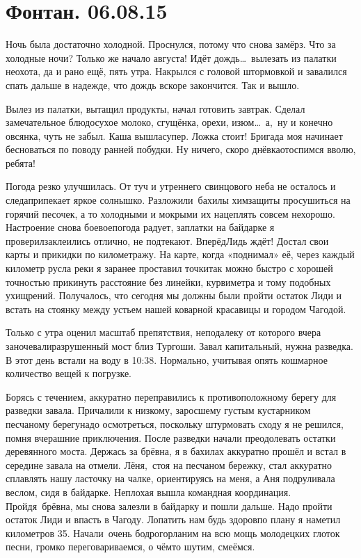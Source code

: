 \chapter{Фонтан. 06.08.15}

Ночь была достаточно холодной. Проснулся, потому что снова замёрз. Что за холодные ночи? Только же начало августа! Идёт дождь\ldots~вылезать из палатки неохота, да и рано ещё, пять утра. Накрылся с головой штормовкой и завалился спать дальше в надежде, что дождь вскоре закончится. Так и вышло. 

Вылез из палатки, вытащил продукты, начал готовить завтрак. Сделал замечательное блюдо\mdash сухое молоко, сгущёнка, орехи, изюм\ldots~а,~ну и конечно овсянка, чуть не забыл. Каша вышла\mdash супер. Ложка стоит! Бригада моя начинает бесноваться по поводу ранней побудки. Ну ничего, скоро днёвка\mdash отоспимся вволю, ребята! 

Погода резко улучшилась. От туч и утреннего свинцового неба не осталось и следа\mdash припекает яркое солнышко. Разложили~бахилы химзащиты просушиться на горячий песочек, а то холодными и мокрыми их нацеплять совсем нехорошо. Настроение снова боевое\mdash погода радует, заплатки на байдарке я проверил\mdash заклеились отлично, не подтекают. Вперёд\mdash Лидь ждёт! Достал свои карты и прикидки по километражу. На карте, когда «поднимал» её, через каждый километр русла реки я заранее проставил точки\mdash так можно быстро с хорошей точностью прикинуть расстояние без линейки, курвиметра и тому подобных ухищрений. Получалось, что сегодня мы должны были пройти остаток Лиди и встать на стоянку между устьем нашей коварной красавицы и городом Чагодой.

Только с утра оценил масштаб препятствия, неподалеку от которого вчера заночевали\mdash  разрушенный мост близ Тургоши. Завал капитальный, нужна разведка. В этот день встали на воду в 10:38. Нормально, учитывая опять кошмарное количество вещей к погрузке. 

Борясь с течением, аккуратно переправились к противоположному берегу для разведки завала. Причалили к низкому, заросшему густым кустарником песчаному берегу\mdash надо осмотреться, поскольку штурмовать сходу я не решился, помня вчерашние приключения. После разведки начали преодолевать остатки деревянного моста. Держась за брёвна, я в бахилах аккуратно прошёл и встал в середине завала на отмели. Лёня,~стоя на песчаном бережку, стал аккуратно сплавлять нашу ласточку на чалке, ориентируясь на меня, а Аня подруливала веслом, сидя в байдарке. Неплохая вышла командная координация. Пройдя~брёвна, мы снова залезли в байдарку и пошли дальше. Надо пройти остаток Лиди и впасть в Чагоду. Лопатить нам будь здоров\mdash по плану я наметил километров 35. Начали~очень бодро\mdash горланим на всю мощь молодецких глоток песни, громко переговариваемся, о чём\sdash то шутим, смеёмся.  

